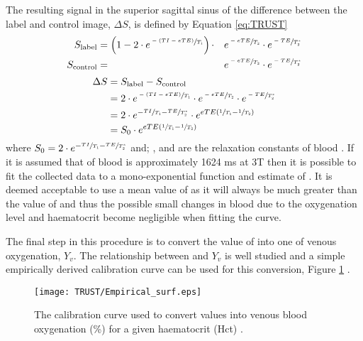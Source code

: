 The resulting signal in the superior sagittal sinus of the difference between the label and control image, $\Delta S$, is defined by Equation \eqref{eq:TRUST}
\begin{alignat}{2}
	S_{\text{label}} &=\left(1-2\cdot e^{\sfrac{-\left(TI - eTE\right)}{T_1}}\right) \cdot & &e^{\sfrac{-eTE}{T_2}} \cdot e^{\sfrac{-TE}{T_2^*}} \\
	S_{\text{control}} &= & &e^{\sfrac{-eTE}{T_2}} \cdot e^{\sfrac{-TE}{T_2^*}} 
\end{alignat}  
\begin{alignat}{1}
	\Delta S&=S_{\text{label}}-S_{\text{control}}\nonumber\\
	&= 2\cdot e^{\sfrac{-\left(TI - eTE\right)}{T_1}} \cdot e^{\sfrac{-eTE}{T_2}} \cdot e^{\sfrac{-TE}{T_2^*}} \nonumber\\
	&= 2 \cdot e^{-\sfrac{TI}{T_1}-\sfrac{TE}{T_2^*}} \cdot e^{eTE\left(\sfrac{1}{T_1}-\sfrac{1}{T_2}\right)}\nonumber\\
	&=S_0 \cdot e^{eTE\left(\sfrac{1}{T_1}-\sfrac{1}{T_2}\right)}
	\label{eq:TRUST}
\end{alignat}  
where $S_0=2 \cdot e^{-\sfrac{TI}{T_1}-\sfrac{TE}{T_2^*}}$ and; \tone, \ttwo and \ttwostar are the relaxation constants of blood \cite{lu_quantitative_2008}. If it is assumed that \tone of blood is approximately 1624 ms at 3T \cite{lu_determining_2004} then it is possible to fit the collected data to a mono-exponential function and estimate of \ttwo. It is deemed acceptable to use a mean value of \tone as it will always be much greater than the value of \ttwo and thus the possible small changes in blood \tone due to the oxygenation level and haematocrit become negligible when fitting the \ttwo curve.

The final step in this procedure is to convert the value of \ttwo into one of venous oxygenation, $Y_v$. The relationship between \ttwo and $Y_v$ is well studied and a simple empirically derived calibration curve can be used for this conversion, Figure \ref{fig:calibration_curve} \cite{gardener_dependence_2010, silvennoinen_comparison_2003, liu_t1_2016}.

\begin{figure}[H]
	\centering
	\texttt{[image: TRUST/Empirical\_surf.eps]}
	\caption{The calibration curve used to convert \ttwo values into venous blood oxygenation (\%) for a given haematocrit (Hct) \cite{lu_calibration_2012}.}
	\label{fig:calibration_curve}	
\end{figure}

